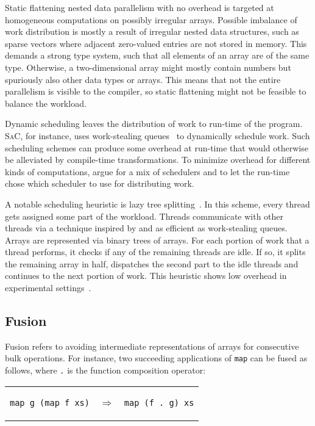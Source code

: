 \documentclass[a4paper]{article}
\newcommand{\sac}{S\textsc{a}C}
\begin{document}
Static flattening nested data parallelism with no overhead is targeted
at homogeneous computations on possibly irregular arrays. Possible
imbalance of work distribution is mostly a result of irregular nested
data structures, such as sparse vectors where adjacent zero-valued
entries are not stored in memory. This demands a strong type system,
such that all elements of an array are of the same type. Otherwise, a
two-dimensional array might mostly contain numbers but spuriously also
other data types or arrays. This means that not the entire parallelism
is visible to the compiler, so static flattening might not be feasible
to balance the workload.

Dynamic scheduling leaves the distribution of work to run-time of the
program. \sac{}, for instance, uses work-stealing
queues~\cite{Chase2005Dynamic, Grelck:2007:SOS:1248648.1248654} to
dynamically schedule work. Such scheduling schemes can produce some
overhead at run-time that would otherwise be alleviated by
compile-time transformations. To minimize overhead for different kinds
of computations, \citet{Fluet:2008:SFG:1411204.1411239} argue for a
mix of schedulers and to let the run-time chose which scheduler to use
for distributing work.

A notable scheduling heuristic is lazy tree
splitting~\cite{Bergstrom:2010:LTS:1863543.1863558}. In this scheme,
every thread gets assigned some part of the workload. Threads
communicate with other threads via a technique inspired by and as
efficient as work-stealing queues. Arrays are represented via binary
trees of arrays. For each portion of work that a thread performs, it
checks if any of the remaining threads are idle. If so, it splits the
remaining array in half, dispatches the second part to the idle
threads and continues to the next portion of work. This heuristic
shows low overhead in experimental
settings~\cite{Bergstrom:2010:LTS:1863543.1863558}.

\subsection{Fusion}
\label{sec:fusion}

Fusion refers to avoiding intermediate representations of arrays for
consecutive bulk operations. For instance, two succeeding applications
of \texttt{map} can be fused as follows, where \texttt{.} is the
function composition operator:

\begin{center}
  \begin{tabular}{ccc}
\begin{lstlisting}[language=ML]
map g (map f xs)
\end{lstlisting}
    & $\Longrightarrow$ &
\begin{lstlisting}[language=ML]
map (f . g) xs
\end{lstlisting}
  \end{tabular}
\end{center}
\end{document}
